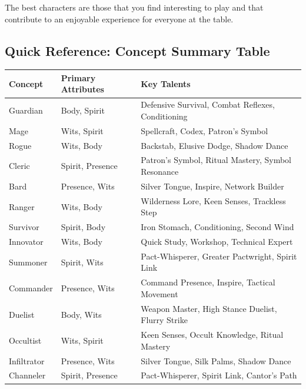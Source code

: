 The best characters are those that you find interesting to play and that contribute to an enjoyable experience for everyone at the table.

\subsection*{Quick Reference: Concept Summary Table}

\begin{center}
\begin{longtable}{p{2.5cm}p{2.5cm}p{8cm}}
\toprule
\textbf{Concept} & \textbf{Primary Attributes} & \textbf{Key Talents} \\
\midrule
Guardian & Body, Spirit & Defensive Survival, Combat Reflexes, Conditioning \\
Mage & Wits, Spirit & Spellcraft, Codex, Patron's Symbol \\
Rogue & Wits, Body & Backstab, Elusive Dodge, Shadow Dance \\
Cleric & Spirit, Presence & Patron's Symbol, Ritual Mastery, Symbol Resonance \\
Bard & Presence, Wits & Silver Tongue, Inspire, Network Builder \\
Ranger & Wits, Body & Wilderness Lore, Keen Senses, Trackless Step \\
Survivor & Spirit, Body & Iron Stomach, Conditioning, Second Wind \\
Innovator & Wits, Body & Quick Study, Workshop, Technical Expert \\
Summoner & Spirit, Wits & Pact-Whisperer, Greater Pactwright, Spirit Link \\
Commander & Presence, Wits & Command Presence, Inspire, Tactical Movement \\
Duelist & Body, Wits & Weapon Master, High Stance Duelist, Flurry Strike \\
Occultist & Wits, Spirit & Keen Senses, Occult Knowledge, Ritual Mastery \\
Infiltrator & Presence, Wits & Silver Tongue, Silk Palms, Shadow Dance \\
Channeler & Spirit, Presence & Pact-Whisperer, Spirit Link, Cantor's Path \\
\bottomrule
\end{longtable}
\end{center}